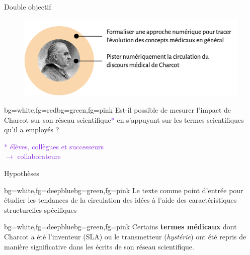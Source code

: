 \begin{frame}{Double objectif}
	\begin{figure}
		\centering
		\includegraphics[width=1\textwidth]{pic/objectif_double.png}
	\end{figure}
	
	\begin{variableblock}{}{bg=white,fg=red}{bg=green,fg=pink}
		\centering
		Est-il possible de mesurer l'impact de Charcot sur son réseau scientifique\textcolor{BlueViolet}{*} en s'appuyant sur les termes scientifiques qu'il a employés ?
	\end{variableblock}
	\begin{flushright}
		{\footnotesize\textcolor{BlueViolet}{* élèves, collègues et successeurs\\
				$\rightarrow$ collaborateurs}}
	\end{flushright}
	
	
\end{frame}

\begin{frame}{Hypothèses}


	\begin{variableblock}{}{bg=white,fg=deepblue}{bg=green,fg=pink}
		\justifying
	Le texte comme point d’entrée pour étudier les tendances de la circulation des idées à l'aide des caractéristiques structurelles spécifiques \\\raggedleft\textcolor{deepred}{\citep{milia2023}}
\end{variableblock}

		\begin{variableblock}{}{bg=white,fg=deepblue}{bg=green,fg=pink}
	\justifying
	Certains \textbf{termes médicaux} dont Charcot a été l’inventeur (\textsc{SLA}) ou le transmetteur (\textit{hystérie}) ont été repris de manière significative dans les écrits de son réseau scientifique.
\end{variableblock}
\end{frame}

